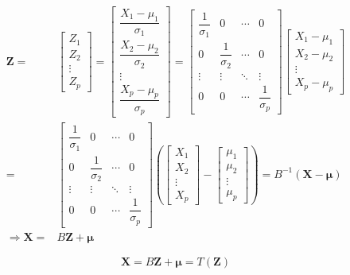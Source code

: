 \documentclass[
]{book}
\theoremstyle{definition}
\theoremstyle{definition}
\theoremstyle{definition}
\theoremstyle{definition}
\theoremstyle{remark}
\begin{document}
\[
\begin{aligned}
\boldsymbol{Z}= & \begin{bmatrix}Z_{1}\\
Z_{2}\\
\vdots\\
Z_{p}
\end{bmatrix}=\begin{bmatrix}\dfrac{X_{1}-\mu_{1}}{\sigma_{1}}\\
\dfrac{X_{2}-\mu_{2}}{\sigma_{2}}\\
\vdots\\
\dfrac{X_{p}-\mu_{p}}{\sigma_{p}}
\end{bmatrix}=\begin{bmatrix}\dfrac{1}{\sigma_{1}} & 0 & \cdots & 0\\
0 & \dfrac{1}{\sigma_{2}} & \cdots & 0\\
\vdots & \vdots & \ddots & \vdots\\
0 & 0 & \cdots & \dfrac{1}{\sigma_{p}}
\end{bmatrix}\begin{bmatrix}X_{1}-\mu_{1}\\
X_{2}-\mu_{2}\\
\vdots\\
X_{p}-\mu_{p}
\end{bmatrix}\\
= & \begin{bmatrix}\dfrac{1}{\sigma_{1}} & 0 & \cdots & 0\\
0 & \dfrac{1}{\sigma_{2}} & \cdots & 0\\
\vdots & \vdots & \ddots & \vdots\\
0 & 0 & \cdots & \dfrac{1}{\sigma_{p}}
\end{bmatrix}\left(\begin{bmatrix}X_{1}\\
X_{2}\\
\vdots\\
X_{p}
\end{bmatrix}-\begin{bmatrix}\mu_{1}\\
\mu_{2}\\
\vdots\\
\mu_{p}
\end{bmatrix}\right)=B^{-1}\left(\boldsymbol{X}-\boldsymbol{\mu}\right)\\
\Rightarrow\boldsymbol{X}= & B\boldsymbol{Z}+\boldsymbol{\mu}
\end{aligned}
\]

\[
\boldsymbol{X} = B\boldsymbol{Z} + \boldsymbol{\mu} = T\left(\boldsymbol{Z}\right)
\]
\end{document}
